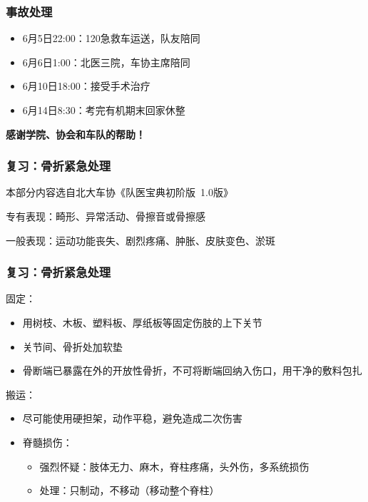 \documentclass[12pt,AutoFakeBold]{beamer}
\begin{document}
    \begin{frame}
        \frametitle{事故处理}
        \begin{itemize}
            \item 6月5日22:00：120急救车运送，队友陪同
            \item 6月6日1:00：北医三院，车协主席陪同
            \item 6月10日18:00：接受手术治疗
            \item 6月14日8:30：考完有机期末回家休整
        \end{itemize}
        \begin{center}
            \textbf{感谢学院、协会和车队的帮助！}
        \end{center}
    \end{frame}

    \begin{frame}
        \frametitle{复习：骨折紧急处理}
        本部分内容选自北大车协《队医宝典初阶版\ 1.0版》
        
        专有表现：畸形、异常活动、骨擦音或骨擦感

        一般表现：运动功能丧失、剧烈疼痛、肿胀、皮肤变色、淤斑
    \end{frame}

    \begin{frame}
        \frametitle{复习：骨折紧急处理}
        固定：
        \begin{itemize}
            \item 用树枝、木板、塑料板、厚纸板等固定伤肢的上下关节
            \item 关节间、骨折处加软垫
            \item 骨断端已暴露在外的开放性骨折，不可将断端回纳入伤口，用干净的敷料包扎
        \end{itemize}
        
        搬运：
        \begin{itemize}
            \item 尽可能使用硬担架，动作平稳，避免造成二次伤害
            \item 脊髓损伤：
            \begin{itemize}
                \item 强烈怀疑：肢体无力、麻木，脊柱疼痛，头外伤，多系统损伤
                \item 处理：只制动，不移动（移动整个脊柱）
            \end{itemize}
        \end{itemize}
    \end{frame}
\end{document}
